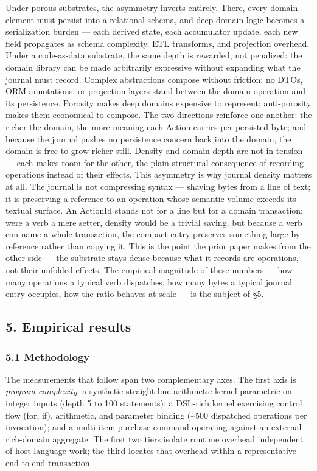 \documentclass[
]{article}
\begin{document}
Under porous substrates, the asymmetry inverts entirely. There, every
domain element must persist into a relational schema, and deep domain
logic becomes a serialization burden --- each derived state, each
accumulator update, each new field propagates as schema complexity, ETL
transforms, and projection overhead. Under a code-as-data substrate, the
same depth is rewarded, not penalized: the domain library can be made
arbitrarily expressive without expanding what the journal must record.
Complex abstractions compose without friction: no DTOs, ORM annotations,
or projection layers stand between the domain operation and its
persistence. Porosity makes deep domains expensive to represent;
anti-porosity makes them economical to compose. The two directions
reinforce one another: the richer the domain, the more meaning each
Action carries per persisted byte; and because the journal pushes no
persistence concern back into the domain, the domain is free to grow
richer still. Density and domain depth are not in tension --- each makes
room for the other, the plain structural consequence of recording
operations instead of their effects. This asymmetry is why journal
density matters at all. The journal is not compressing syntax ---
shaving bytes from a line of text; it is preserving a reference to an
operation whose semantic volume exceeds its textual surface. An ActionId
stands not for a line but for a domain transaction: were a verb a mere
setter, density would be a trivial saving, but because a verb can name a
whole transaction, the compact entry preserves something large by
reference rather than copying it. This is the point the prior paper
makes from the other side --- the substrate stays dense because what it
records are operations, not their unfolded effects. The empirical
magnitude of these numbers --- how many operations a typical verb
dispatches, how many bytes a typical journal entry occupies, how the
ratio behaves at scale --- is the subject of §5.

\subsection{5. Empirical results}\label{empirical-results}

\subsubsection{5.1 Methodology}\label{methodology}

The measurements that follow span two complementary axes. The first axis
is \emph{program complexity}: a synthetic straight-line arithmetic
kernel parametric on integer inputs (depth 5 to 100 statements); a
DSL-rich kernel exercising control flow (for, if), arithmetic, and
parameter binding (\textasciitilde500 dispatched operations per
invocation); and a multi-item purchase command operating against an
external rich-domain aggregate. The first two tiers isolate runtime
overhead independent of host-language work; the third locates that
overhead within a representative end-to-end transaction.
\end{document}
